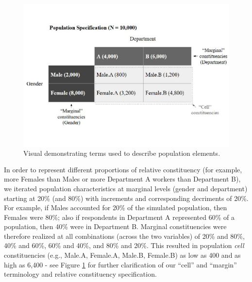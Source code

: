 \documentclass[
  man,mask]{apa7}
\begin{document}
\begin{figure}
\centering
\includegraphics{paper_files/figure-latex/example1-1.pdf}
\caption{\label{fig:example1}Visual demonstrating terms used to describe population elements.}
\end{figure}

In order to represent different proportions of relative constituency (for example, more Females than Males or more Department A workers than Department B), we iterated population characteristics at marginal levels (gender and department) starting at 20\% (and 80\%) with increments and corresponding decriments of 20\%. For example, if Males accounted for 20\% of the simulated population, then Females were 80\%; also if respondents in Department A represented 60\% of a population, then 40\% were in Department B. Marginal constituencies were therefore realized at all combinations (across the two variables) of 20\% and 80\%, 40\% and 60\%, 60\% and 40\%, and 80\% and 20\%. This resulted in population \emph{cell} constituencies (e.g., Male.A, Female.A, Male.B, Female.B) as low as 400 and as high as 6,400 - see Figure \ref{fig:example1} for further clarification of our ``cell'' and ``margin'' terminology and relative constituency specification.
\end{document}
